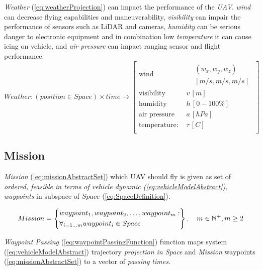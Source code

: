 	\newpage    
    \noindent\emph{Weather} (\ref{eq:weatherProjection}) can impact the performance of the \emph{UAV}. \emph{wind} can decrease flying capabilities and maneuverability, \emph{visibility} can impair the performance of sensors such as LiDAR and cameras, \emph{humidity} can be serious danger to electronic equipment and in combination low \emph{temperature} it can cause icing on vehicle, and \emph{air pressure} can impact ranging sensor and flight performance. 
    \begin{equation}\label{eq:weatherProjection}
        Weather:\left(position\in Space\right) \times time \to
        \left[
        \begin{aligned}
            \text{wind } & \begin{aligned}&(w_x,w_y,w_z)\\&[m/s,m/s,m/s]\end{aligned}\\
            \text{visibility }& v\,[m]\\
            \text{humidity }& h\,[0-100 \%] \\
            \text{air pressure }& a\,[hPa]\\
            \text{temperature: }& \tau\,[C]\\
        \end{aligned}
        \right]
    \end{equation}

\subsection{Mission}\label{s:mission}
    \emph{Mission} (\ref{eq:missionAbstractSet}) which UAV should fly is given as set of \emph{ordered, feasible in terms of vehicle dynamic (\ref{eq:vehicleModelAbstract}), waypoints} in subspace of $Space$ (\ref{eq:SpaceDefinition}).
    
    \begin{equation}\label{eq:missionAbstractSet}
        Mission = \left\{
        \begin{aligned}
            &waypoint_1, waypoint_2, \dots,waypoint_m:\\
            &\forall_{i=1\dots m} waypoint_i \in  Space
        \end{aligned}
        \right\}, \quad m\in\mathbb{N}^{+},m\ge2
    \end{equation}

    \emph{Waypoint Passing} (\ref{eq:waypointPassingFunction}) function maps system (\ref{eq:vehicleModelAbstract}) trajectory \emph{projection in Space} and \emph{Mission} waypoints (\ref{eq:missionAbstractSet}) to a vector of \emph{passing times}.
    
